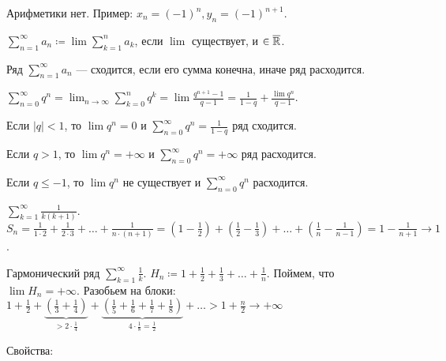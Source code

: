 \begin{remark}
    Арифметики нет. Пример: $x_n = (-1)^n, y_n = (-1)^{n+1}$.
\end{remark}
\begin{definition}
    $\sum_{n=1}^\infty a_n \coloneqq \lim \sum_{k=1}^n a_k$, если $\lim$ существует, и $\in \overline{\mathbb{R}}$.
\end{definition}
\begin{definition}
    Ряд $\sum_{n=1}^\infty a_n$ --- сходится, если его сумма конечна, иначе ряд расходится.
\end{definition}
\begin{example}
    $\sum_{n=0}^\infty q^n = \lim_{n\to\infty} \sum_{k=0}^n q^k = \lim \frac{q^{n+1} - 1}{q-1} = \frac{1}{1 - q} + \frac{\lim q^n}{q-1}$.

    Если $|q| < 1$, то  $\lim q^n = 0$ и  $\sum_{n=0}^\infty q^n = \frac{1}{1 - q}$ ряд сходится.

    Если $q > 1$, то $\lim q^n = +\infty$ и  $\sum_{n=0}^\infty q^n = +\infty$ ряд расходится.

    Если  $q \le -1$, то $\lim q^n$ не существует и  $\sum_{n=0}^\infty q^n$ расходится.
\end{example}
\begin{example}
    $\sum_{k=1}^\infty \frac{1}{k(k+1)}$. $S_n = \frac{1}{1 \cdot 2} + \frac{1}{2 \cdot 3} + \ldots + \frac{1}{n \cdot (n+1)} = \left(1 - \frac{1}{2}\right) + \left(\frac{1}{2} - \frac{1}{3}\right) + \ldots + \left(\frac{1}{n} - \frac{1}{n-1}\right) = 1 - \frac{1}{n + 1} \to 1$.
\end{example}
\begin{example}
    Гармонический ряд $\sum_{k=1}^\infty \frac{1}{k}$. $H_n \coloneqq 1 + \frac{1}{2} + \frac{1}{3} + \ldots + \frac{1}{n}$.
    Поймем, что $\lim H_n = +\infty$. Разобьем на блоки:  $1 + \frac{1}{2} + \underbrace{\left(\frac{1}{3} + \frac{1}{4}\right)}_{ > 2 \cdot \frac{1}{4}} + \underbrace{\left(\frac{1}{5} + \frac{1}{6} + \frac{1}{7} + \frac{1}{8}\right)}_{4 \cdot \frac{1}{8}  = \frac{1}{2}} + \ldots > 1 + \frac{n}{2} \to +\infty$
\end{example}
\slashn
Свойства:
